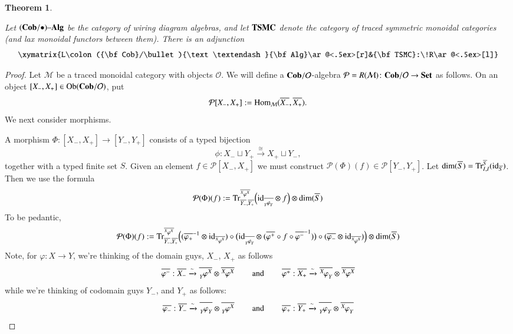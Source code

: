\documentclass{amsart}
\def\tn{\textnormal}
\def\mc{\mathcal}
\def\Hom{\tn{Hom}}
\def\Ob{\tn{Ob}}
\def\dim{\tn{dim}}
\def\Trace{\tn{Tr}}
\def\hsp{\hspace{.3in}}
\def\to{\rightarrow}
\def\taking{\colon}
\def\too{\longrightarrow}
\def\iso{\cong}
\def\ol{\overline}
\newcommand{\To}[1]{\xrightarrow{#1}}
\def\id{\tn{id}}
\def\Cob{{\bf Cob}}
\def\Set{{\bf Set}}
\def\alg{{\text \textendash}{\bf Alg}}
\def\mcM{\mc{M}}
\def\mcO{\mc{O}}
\def\mcP{\mc{P}}
\newcommand{\inp}[1]{{#1_-}}
\newcommand{\outp}[1]{{#1_+}}
\newcommand{\feeddd}[3]{{\tensor*[^{#2}_{\color{white}{!}}]{{#1}}{^{#3}}}}%
\newcommand{\feeddc}[3]{{\tensor*[^{#2}]{{#1}}{_{#3}}}}
\newcommand{\feedcd}[3]{{\tensor*[_{#2}]{{#1}}{^{#3}}}}
\newcommand{\feedcc}[3]{{\tensor*[^{\color{white}{!}}_{#2}]{{#1}}{_{#3}}}}
\newcommand{\vLst}[1]{\ol{#1}}
\newcommand{\vinp}[1]{\vLst{\inp{#1}}}
\newcommand{\voutp}[1]{\vLst{\outp{#1}}}
\def\TSMC{{\bf TSMC}}
\newtheorem{theorem}[subsubsection]{Theorem}
\theoremstyle{remark}
\theoremstyle{definition}
\begin{document}
\begin{theorem}\label{thm:cobalg trace adjunction}

Let $(\Cob/\bullet)\alg$ be the category of wiring diagram algebras, and let $\TSMC$ denote the category of traced symmetric monoidal categories (and lax monoidal functors between them). There is an adjunction
$$\xymatrix{L\taking(\Cob/\bullet)\alg\ar@<.5ex>[r]&\TSMC:\!R\ar@<.5ex>[l]}$$

\end{theorem}

\begin{proof}

Let $\mcM$ be a traced monoidal category with objects $\mcO$. We will define a $\Cob/\mcO$-algebra $\mcP=R(\mcM)\taking\Cob/\mcO\to\Set$ as follows. On an object $[\inp{X},\outp{X}]\in\Ob(\Cob/\mcO)$, put 
$$\mcP[\inp{X},\outp{X}]:=\Hom_{\mcM}(\vinp{X},\voutp{X}).$$
We next consider morphisms.


A morphism $\Phi\taking[\inp{X},\outp{X}]\too[\inp{Y},\outp{Y}]$ consists of a typed bijection 
$$\phi\taking\inp{X}\sqcup \outp{Y}\To{\iso}\outp{X}\sqcup \inp{Y},$$ 
together with a typed finite set $S$. Given an element $f\in\mcP[\inp{X},\outp{X}]$ we must construct $\mcP(\Phi)(f)\in\mcP[\inp{Y},\outp{Y}]$. Let $\dim(\ol{S})=\Trace^{\ol{S}}_{I,I}(\id_{\ol{S}})$. Then we use the formula
$$\mcP(\Phi)(f):=
\Trace^{\ol{\feeddd{\varphi}{X}{X}}}_{\ol{Y_-},\ol{Y_+}}\Big(
\id_{\ol{\feedcc{\varphi}{Y}{Y}}}\otimes f
\Big)
\otimes\dim(\ol{S})
$$
To be pedantic, 
$$\mcP(\Phi)(f):=
\Trace^{\ol{\feeddd{\varphi}{X}{X}}}_{\ol{Y_-},\ol{Y_+}}\Big(
(\ol{\varphi_+}^{-1}\otimes\id_{\ol{\feeddd{\varphi}{X}{X}}})\circ\big(\id_{\ol{\feedcc{\varphi}{Y}{Y}}}\otimes (\ol{\varphi^+}\circ f\circ\ol{\varphi^-}^{-1})\big)\circ(\ol{\varphi_-}\otimes\id_{\ol{\feeddd{\varphi}{X}{X}}})
\Big)
\otimes\dim(\ol{S})
$$
Note, for $\varphi\taking X\to Y$, we're thinking of the domain guys, $\inp{X}$, $\outp{X}$ as follows
$$
\ol{\varphi^-}:\ol{\inp{X}}\To{\sim}\ol{\feedcd{\varphi}{Y}{X}}\otimes\ol{\feeddd{\varphi}{X}{X}}
\hsp\tn{and}\hsp
\ol{\varphi^+}:\ol{\outp{X}}\To{\sim}\ol{\feeddc{\varphi}{X}{Y}}\otimes\ol{\feeddd{\varphi}{X}{X}}
$$
while we're thinking of codomain guys $\inp{Y}$, and $\outp{Y}$ as follows:
$$
\ol{\varphi_-}:\ol{\inp{Y}}\To{\sim}\ol{\feedcc{\varphi}{Y}{Y}}\otimes\ol{\feedcd{\varphi}{Y}{X}}
\hsp\tn{and}\hsp
\ol{\varphi_+}:\ol{\outp{Y}}\To{\sim}\ol{\feedcc{\varphi}{Y}{Y}}\otimes\ol{\feeddc{\varphi}{X}{Y}}
$$


\end{proof}
\end{document}
